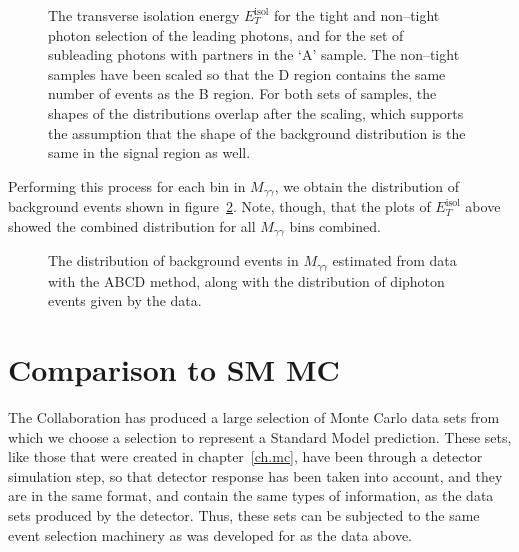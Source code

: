 \begin{figure}[htp]
\begin{minipage}[b]{.69\textwidth}
\begin{infilsf} \tiny 

\end{infilsf}
\end{minipage}\hfill\begin{minipage}[b]{.3\textwidth}
\caption{The transverse isolation energy $E_T^{\text{isol}}$ for the tight and non--tight photon selection of the leading photons, and for the set of subleading photons with partners in the `A' sample. The non--tight samples have been scaled so that the D region contains the same number of events as the B region. For both sets of samples, the shapes of the distributions overlap after the scaling, which supports the assumption that the shape of the background distribution is the same in the signal region as well.
\label{etiso}}
\end{minipage}
\end{figure}

Performing this process for each bin in $M_{\gamma\gamma}$, we obtain the distribution of background events shown in figure~\ref{mggbck}. Note, though, that the plots of $E_T^{\text{isol}}$ above showed the combined distribution for all $M_{\gamma\gamma}$ bins combined.

\begin{figure}[htp]
\begin{minipage}[b]{.69\textwidth}
\begin{infilsf} \tiny 

\end{infilsf}
\end{minipage}\hfill\begin{minipage}[b]{.3\textwidth}
\caption{The distribution of background events in $M_{\gamma\gamma}$ estimated from data with the ABCD method, along with the distribution of diphoton events given by the data.
\label{mggbck}}
\end{minipage}
\end{figure}

\section{Comparison to SM MC}

The \atlas{} Collaboration has produced a large selection of Monte Carlo data sets from which we choose a selection to represent a Standard Model prediction.  These sets, like those that were created in chapter~\ref{ch.mc}, have been through a detector simulation step, so that detector response has been taken into account, and they are in the same format, and contain the same types of information, as the data sets produced by the \atlas{} detector. Thus, these sets can be subjected to the same event selection machinery as was developed for as the data above.

